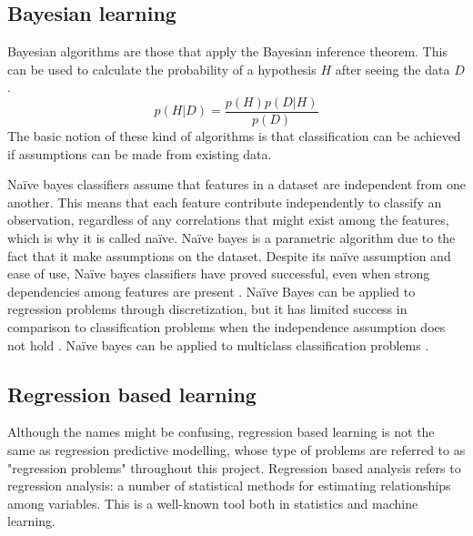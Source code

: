 
	\subsection{Bayesian learning}
		Bayesian algorithms are those that apply the Bayesian inference theorem. This can be used to calculate the probability of a hypothesis $H$ after seeing the data $D$.
		\begin{equation} \label{eq:bayes}
			p(H|D) = \frac{p(H)p(D|H)}{p(D)}
		\end{equation} 
	The basic notion of these kind of algorithms is that classification can be achieved if assumptions can be made from existing data. %

	Naïve bayes classifiers assume that features in a dataset are independent from one another. This means that each feature contribute independently to classify an observation, regardless of any correlations that might exist among the features, which is why it is called naïve. Naïve bayes is a parametric algorithm due to the fact that it make assumptions on the dataset. Despite its naïve assumption and ease of use, Naïve bayes classifiers have proved successful, even when strong dependencies among features are present \cite{ARTICLE:13, IP:4}. Naïve Bayes can be applied to regression problems through discretization, but it has limited success in comparison to classification problems when the independence assumption does not hold \cite{ARTICLE:14}. Naïve bayes can be applied to multiclass classification problems \cite{ARTICLE:17}. 

	 
	\subsection{Regression based learning} \label{sec:reg_based_learning}
		Although the names might be confusing, regression based learning is not the same as regression predictive modelling, whose type of problems are referred to as "regression problems" throughout this project. Regression based analysis refers to regression analysis: a number of statistical methods for estimating relationships among variables. This is a well-known tool both in statistics and machine learning. 

